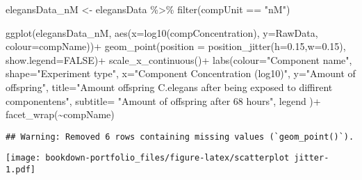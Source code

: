 \documentclass[
]{book}
\newenvironment{Shaded}{\begin{snugshade}}{\end{snugshade}}
\newcommand{\AttributeTok}[1]{\textcolor[rgb]{0.77,0.63,0.00}{#1}}
\newcommand{\ConstantTok}[1]{\textcolor[rgb]{0.00,0.00,0.00}{#1}}
\newcommand{\FloatTok}[1]{\textcolor[rgb]{0.00,0.00,0.81}{#1}}
\newcommand{\FunctionTok}[1]{\textcolor[rgb]{0.00,0.00,0.00}{#1}}
\newcommand{\NormalTok}[1]{#1}
\newcommand{\OtherTok}[1]{\textcolor[rgb]{0.56,0.35,0.01}{#1}}
\newcommand{\SpecialCharTok}[1]{\textcolor[rgb]{0.00,0.00,0.00}{#1}}
\newcommand{\StringTok}[1]{\textcolor[rgb]{0.31,0.60,0.02}{#1}}
\begin{document}
\begin{Shaded}
\begin{Highlighting}[]
\NormalTok{elegansData\_nM }\OtherTok{\textless{}{-}}\NormalTok{ elegansData }\SpecialCharTok{\%\textgreater{}\%} \FunctionTok{filter}\NormalTok{(compUnit }\SpecialCharTok{==} \StringTok{"nM"}\NormalTok{)}

  \FunctionTok{ggplot}\NormalTok{(elegansData\_nM, }\FunctionTok{aes}\NormalTok{(}\AttributeTok{x=}\FunctionTok{log10}\NormalTok{(compConcentration), }\AttributeTok{y=}\NormalTok{RawData, }\AttributeTok{colour=}\NormalTok{compName))}\SpecialCharTok{+}
  \FunctionTok{geom\_point}\NormalTok{(}\AttributeTok{position =} \FunctionTok{position\_jitter}\NormalTok{(}\AttributeTok{h=}\FloatTok{0.15}\NormalTok{,}\AttributeTok{w=}\FloatTok{0.15}\NormalTok{), }\AttributeTok{show.legend=}\ConstantTok{FALSE}\NormalTok{)}\SpecialCharTok{+}
  \FunctionTok{scale\_x\_continuous}\NormalTok{()}\SpecialCharTok{+}
  \FunctionTok{labs}\NormalTok{(}\AttributeTok{colour=}\StringTok{"Component name"}\NormalTok{, }\AttributeTok{shape=}\StringTok{"Experiment type"}\NormalTok{,}
       \AttributeTok{x=}\StringTok{"Component Concentration (log10)"}\NormalTok{,}
       \AttributeTok{y=}\StringTok{"Amount of offspring"}\NormalTok{,}
       \AttributeTok{title=}\StringTok{"Amount offspring C.elegans after being exposed to diffirent componentens"}\NormalTok{,}
       \AttributeTok{subtitle=} \StringTok{"Amount of offspring after 68 hours"}\NormalTok{,}
\NormalTok{       legend}
\NormalTok{)}\SpecialCharTok{+}
  \FunctionTok{facet\_wrap}\NormalTok{(}\SpecialCharTok{\textasciitilde{}}\NormalTok{compName)}
\end{Highlighting}
\end{Shaded}

\begin{verbatim}
## Warning: Removed 6 rows containing missing values (`geom_point()`).
\end{verbatim}

\texttt{[image: bookdown-portfolio\_files/figure-latex/scatterplot jitter-1.pdf]}
\end{document}
